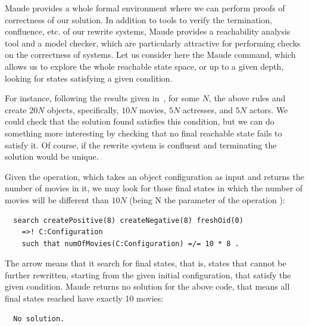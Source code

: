 Maude provides a whole formal environment where we can perform proofs of correctness of our solution. In addition to tools to verify the termination, confluence, etc. of our rewrite systems, Maude provides a reachability analysis tool and a model checker, which are particularly attractive for performing checks on the correctness of systems. Let us consider here the Maude  command, which allows us to explore the whole reachable state space, or up to a given depth, looking for states satisfying a given condition. 

For instance, following the results given in~\cite{imdbcase}, for some $N$, the above rules  and  create $20N$ objects, specifically, $10N$ movies, $5N$ actresses, and $5N$ actors. We could check that the solution found satisfies this condition, but we can do something more interesting by checking that no final reachable state fails to satisfy it. Of course, if the rewrite system is confluent and terminating the solution would be unique. 

Given the  operation, which takes an object configuration as input and returns the number of movies in it, we may look for those final states in which the number of movies will be different than $10N$ (being N the parameter of the operation ):
\begin{verbatim}
  search createPositive(8) createNegative(8) freshOid(0) 
    =>! C:Configuration
    such that numOfMovies(C:Configuration) =/= 10 * 8 .
\end{verbatim}

The arrow \code{=>!} means that it search for final states, that is, states that cannot be further rewritten, starting from the given initial configuration, that satisfy the given condition. Maude returns no solution for the above code, that means all final states reached have exactly 10 movies:
\begin{verbatim}
  No solution.
\end{verbatim}



